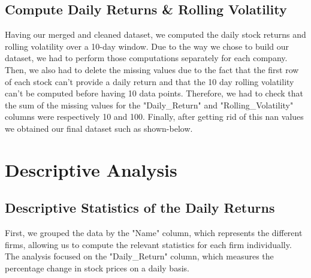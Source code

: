 \documentclass[12pt, oneside]{article}
\begin{document}
\subsection{Compute Daily Returns \& Rolling Volatility}
Having our merged and cleaned dataset, we computed the daily stock returns and rolling volatility over a 10-day window. Due to the way we chose to build our dataset, we had to perform those computations separately for each company. Then, we also had to delete the missing values due to the fact that the first row of each stock can't provide a daily return and that the 10 day rolling volatility can't be computed before having 10 data points. Therefore, we had to check that the sum of the missing values for the "Daily\_Return" and "Rolling\_Volatility" columns were respectively 10 and 100. Finally, after getting rid of this nan values we obtained our final dataset such as shown-below.

\begin{table}[ht]
    \centering
    \caption{Sample of the final dataset}
    \label{tab:final dataset}
\end{table}


\section{Descriptive Analysis}

\subsection{Descriptive Statistics of the Daily Returns}
First, we grouped the data by the "Name" column, which represents the different firms, allowing us to compute the relevant statistics for each firm individually. The analysis focused on the "Daily\_Return" column, which measures the percentage change in stock prices on a daily basis. 
\end{document}
